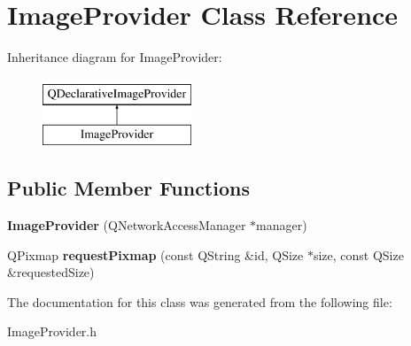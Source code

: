 \hypertarget{classImageProvider}{\section{Image\-Provider Class Reference}
\label{classImageProvider}
}
Inheritance diagram for Image\-Provider\-:\begin{figure}[H]
\begin{center}
\leavevmode
\includegraphics[height=2.000000cm]{classImageProvider}
\end{center}
\end{figure}
\subsection*{Public Member Functions}
\begin{DoxyCompactItemize}
\item 
\hypertarget{classImageProvider_ae46729dae339dc520ac3c7ee9e6a57f3}{{\bfseries Image\-Provider} (Q\-Network\-Access\-Manager $\ast$manager)}\label{classImageProvider_ae46729dae339dc520ac3c7ee9e6a57f3}

\item 
\hypertarget{classImageProvider_af5bad351240a627040ebadf5c181d102}{Q\-Pixmap {\bfseries request\-Pixmap} (const Q\-String \&id, Q\-Size $\ast$size, const Q\-Size \&requested\-Size)}\label{classImageProvider_af5bad351240a627040ebadf5c181d102}

\end{DoxyCompactItemize}


The documentation for this class was generated from the following file\-:\begin{DoxyCompactItemize}
\item 
Image\-Provider.\-h\end{DoxyCompactItemize}
